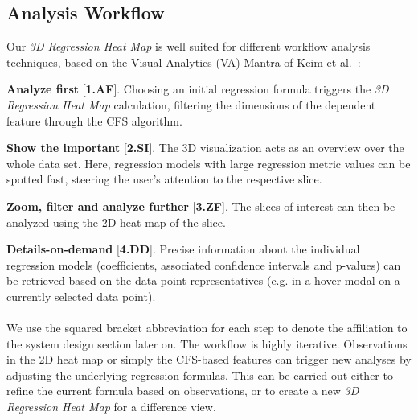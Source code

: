 \documentclass[journal]{style/vgtc} 			          %
\begin{document}
\subsection{Analysis Workflow} \label{sec:Workflow}
\noindent Our \emph{3D Regression Heat Map} is well suited for different workflow analysis techniques, based on the Visual Analytics (VA) Mantra of Keim et al.~\cite{Keim}:

\textbf{Analyze first} [\textbf{1.AF}]. Choosing an initial regression formula triggers the \emph{3D Regression Heat Map} calculation, filtering the dimensions of the dependent feature through the CFS algorithm.

\textbf{Show the important} [\textbf{2.SI}]. The 3D visualization acts as an overview over the whole data set.
Here, regression models with large regression metric values can be spotted fast, steering the user's attention to the respective slice.

\textbf{Zoom, filter and analyze further} [\textbf{3.ZF}]. The slices of interest can then be analyzed using the 2D heat map of the slice.

\textbf{Details-on-demand} [\textbf{4.DD}]. Precise information about the individual regression models (coefficients, associated confidence intervals and p-values) can be retrieved based on the data point representatives (e.g. in a hover modal on a currently selected data point).
\\\\
We use the squared bracket abbreviation for each step to denote the affiliation to the system design section later on.
The workflow is highly iterative.
Observations in the 2D heat map or simply the CFS-based features can trigger new analyses by adjusting the underlying regression formulas.
This can be carried out either to refine the current formula based on observations, or to create a new \emph{3D Regression Heat Map} for a difference view.
\end{document}

